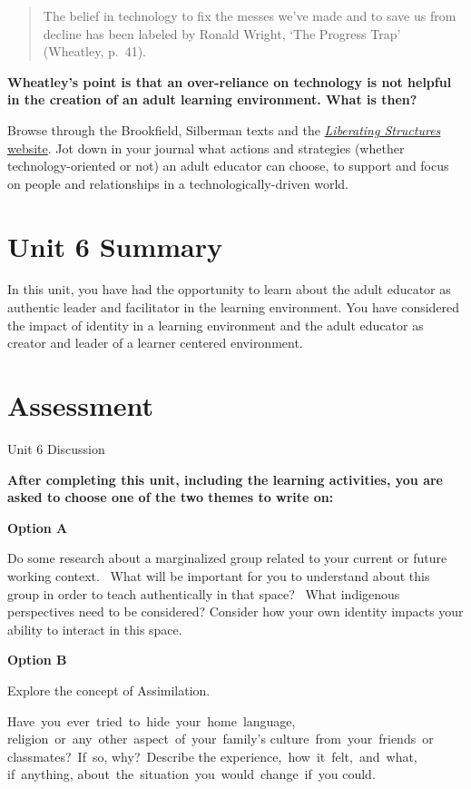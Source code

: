 \documentclass[
]{book}
\begin{document}
\begin{reflect}
\begin{quote}
The belief in technology to fix the messes we've made and to save us from decline has been labeled by Ronald Wright, `The Progress Trap' (Wheatley, p.~41).
\end{quote}

\textbf{Wheatley's point is that an over-reliance on technology is not helpful in the creation of an adult learning environment. What is then?}

Browse through the Brookfield, Silberman texts and the \href{http://www.liberatingstructures.com/ls-menu/}{\emph{Liberating Structures} website}. Jot down in your journal what actions and strategies (whether technology-oriented or not) an adult educator can choose, to support and focus on people and relationships in a technologically-driven world.
\end{reflect}

\hypertarget{unit-6-summary}{%
\section*{Unit 6 Summary}\label{unit-6-summary}}

In this unit, you have had the opportunity to learn about the adult educator as authentic leader and facilitator in the learning environment. You have considered the impact of identity in a learning environment and the adult educator as creator and leader of a learner centered environment.

\hypertarget{assessment-5}{%
\section*{Assessment}\label{assessment-5}}

\begin{assessment}
{Unit 6 Discussion}

\textbf{After completing this unit, including the learning activities, you are asked to choose one of the two themes to write on:}

\textbf{Option A}

Do some research about a marginalized group related to your current or future working context. ~What will be important for you to understand about this group in order to teach authentically in that space? ~What indigenous perspectives need to be considered? Consider how your own identity impacts your ability to interact in this space. ~

\textbf{Option B}

Explore the concept of Assimilation.

Have~you~ever~tried~to~hide~your~home~language, religion~or~any~other~aspect~of~your~family's culture~from~your~friends~or classmates?~If~so, why?~Describe the experience,~how~it~felt,~and~what, if~anything, about~the~situation~you~would~change~if~you could.
\end{assessment}
\end{document}
